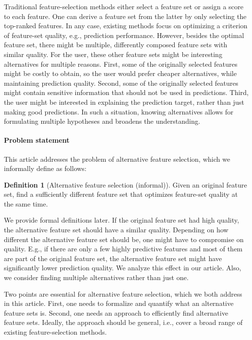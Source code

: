 \documentclass{article}
\theoremstyle{definition}
\newtheorem{definition}{Definition}
\begin{document}
Traditional feature-selection methods either select a feature set or assign a score to each feature.
One can derive a feature set from the latter by only selecting the top-ranked features.
In any case, existing methods focus on optimizing a criterion of feature-set quality, e.g., prediction performance.
However, besides the optimal feature set, there might be multiple, differently composed feature sets with similar quality.
For the user, these other feature sets might be interesting alternatives for multiple reasons.
First, some of the originally selected features might be costly to obtain, so the user would prefer cheaper alternatives, while maintaining prediction quality.
Second, some of the originally selected features might contain sensitive information that should not be used in predictions.
Third, the user might be interested in explaining the prediction target, rather than just making good predictions.
In such a situation, knowing alternatives allows for formulating multiple hypotheses and broadens the understanding.

\paragraph{Problem statement}

This article addresses the problem of alternative feature selection, which we informally define as follows:
%
\begin{definition}[Alternative feature selection (informal)]
	Given an original feature set, find a sufficiently different feature set that optimizes feature-set quality at the same time.
	\label{def:alternative-feature-selection}
\end{definition}
%
We provide formal definitions later.
If the original feature set had high quality, the alternative feature set should have a similar quality.
Depending on how different the alternative feature set should be, one might have to compromise on quality.
E.g., if there are only a few highly predictive features and most of them are part of the original feature set, the alternative feature set might have significantly lower prediction quality.
We analyze this effect in our article.
Also, we consider finding multiple alternatives rather than just one.

Two points are essential for alternative feature selection, which we both address in this article.
First, one needs to formalize and quantify what an alternative feature sets is.
Second, one needs an approach to efficiently find alternative feature sets.
Ideally, the approach should be general, i.e., cover a broad range of existing feature-selection methods.
\end{document}
